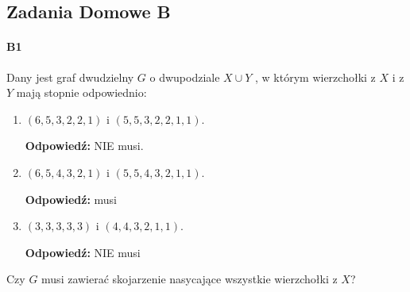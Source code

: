 \documentclass[a4paper,12pt]{article}
\theoremstyle{definition}%
\theoremstyle{definition}
\theoremstyle{problem}
\let\originalforall=\forall%
\renewcommand{\forall}{\mathop{\vcenter{\hbox{\Large$\originalforall$}}}}
\begin{document}
\begin{enumerate}[label=\alph*)]

\end{enumerate}

\subsection{Zadania Domowe B}
\paragraph{B1} Dany jest graf dwudzielny $G$ o dwupodziale $X \cup Y$ , w którym wierzchołki z $X$ i z $Y$ mają stopnie odpowiednio:
\begin{enumerate}[label=\alph*)]
\item $(6, 5, 3, 2, 2, 1)$ i $(5, 5, 3, 2, 2, 1, 1)$.

\textbf{Odpowiedź: } NIE musi.
\item $(6, 5, 4, 3, 2, 1)$ i $(5, 5, 4, 3, 2, 1, 1)$.

\textbf{Odpowiedź: } musi
\item $(3, 3, 3, 3, 3)$ i $(4, 4, 3, 2, 1, 1)$.

\textbf{Odpowiedź: } NIE musi
\end{enumerate}
Czy $G$ musi zawierać skojarzenie nasycające wszystkie wierzchołki z $X$?
\end{document}
